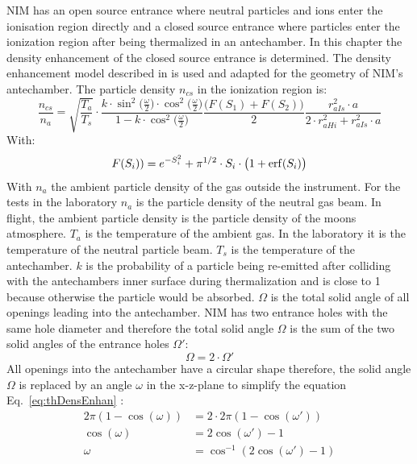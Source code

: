 	NIM has an open source entrance where neutral particles and ions enter the ionisation region directly and a closed source entrance where particles enter the ionization region after being thermalized in an antechamber. In this chapter the density enhancement of the closed source entrance is determined. The density enhancement model described in \cite{DensEnhan_Wurz_07} is used and adapted for the geometry of NIM's antechamber. The particle density $n_{cs}$ in the ionization region is:
	\begin{equation}
		\frac{n_{cs}}{n_a} = \sqrt{\frac{T_a}{T_s}}\cdot\frac{k\cdot \sin^2\big(\frac{\omega}{2}\big)\cdot \cos^2\big(\frac{\omega}{2}\big)}{1-k\cdot \cos^2\big(\frac{\omega}{2}\big)}\frac{\big(F(S_1)+ F(S_2)\big)}{2} \frac{r_{aIs}^2\cdot a}{2\cdot r_{aHi}^2 + r_{aIs}^2\cdot a}
		\label{eq:thDensEnhan}
	\end{equation}
	With:
	\begin{equation}
		F(S_i)) = e^{-S_i^2} + \pi^{1/2}\cdot S_i\cdot\big(1 + {\rm erf}(S_i)\big)
		\label{eq:F(S)}
	\end{equation}
	With $n_a$ the ambient particle density of the gas outside the instrument. For the tests in the laboratory $n_a$ is the particle density of the neutral gas beam. In flight, the ambient particle density is the particle density of the moons atmosphere. $T_a$ is the temperature of the ambient gas. In the laboratory it is the temperature of the neutral particle beam. $T_s$ is the temperature of the antechamber. $k$ is the probability of a particle being re-emitted after colliding with the antechambers inner surface during thermalization and is close to 1 because otherwise the particle would be absorbed. $\Omega$ is the total solid angle of all openings leading into the antechamber. NIM has two entrance holes with the same hole diameter and therefore the total solid angle $\Omega$ is the sum of the two solid angles of the entrance holes $\Omega'$:
	\begin{equation}
		\Omega = 2\cdot\Omega'
	\end{equation}
	All openings into the antechamber have a circular shape therefore, the solid angle $\Omega$ is replaced by an angle $\omega$ in the x-z-plane to simplify the equation Eq.~\eqref{eq:thDensEnhan} \cite{Hedin_1964}: 
	\begin{align}
		2\pi(1- \cos(\omega)) &= 2\cdot 2\pi(1- \cos(\omega'))\\
		\cos(\omega) &= 2\cos(\omega') -1\\
		\omega &= \cos^{-1}(2\cos(\omega') -1)
	\end{align}
